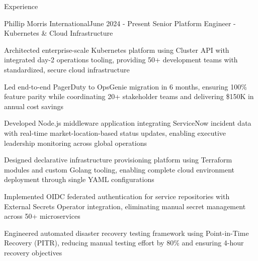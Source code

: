 \documentclass{resume} %
\begin{document}

\begin{rSection}{Experience}
\smallbreak
\begin{rSubsection}{Phillip Morris International}{June 2024 - Present}
{Senior Platform Engineer - Kubernetes \& Cloud Infrastructure}{}
\normalfont
\item Architected enterprise-scale Kubernetes platform using Cluster API with integrated day-2 operations tooling, providing 50+ development teams with standardized, secure cloud infrastructure %
\item Led end-to-end PagerDuty to OpsGenie migration in 6 months, ensuring 100\% feature parity while coordinating 20+ stakeholder teams and delivering \$150K in annual cost savings %
\item Developed Node.js middleware application integrating ServiceNow incident data with real-time market-location-based status updates, enabling executive leadership monitoring across global operations %
\item Designed declarative infrastructure provisioning platform using Terraform modules and custom Golang tooling, enabling complete cloud environment deployment through single YAML configurations %
\item Implemented OIDC federated authentication for service repositories with External Secrets Operator integration, eliminating manual secret management across 50+ microservices %
\item Engineered automated disaster recovery testing framework using Point-in-Time Recovery (PITR), reducing manual testing effort by 80\% and ensuring 4-hour recovery objectives %
\end{rSubsection}



\end{rSection}
\end{document}
